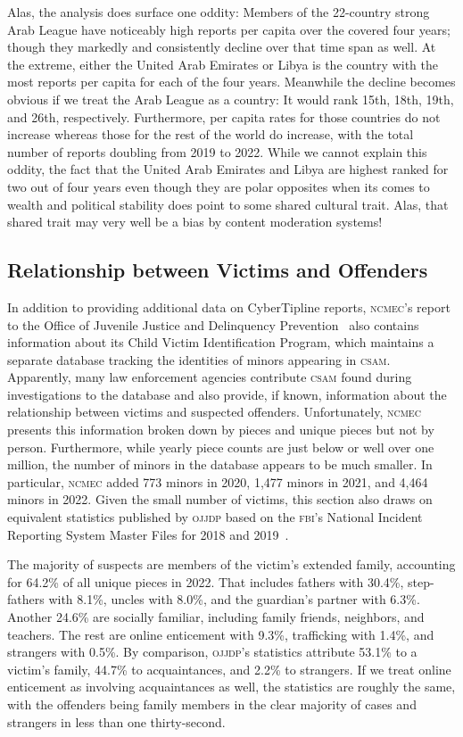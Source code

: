\documentclass[nonacm,screen]{acmart}
\newcommand\V[1]{\textsc{\MakeLowercase{#1}}}
\begin{document}
\begin{itemize}
{Alas, the analysis does surface one oddity: Members of the 22-country strong
Arab League have noticeably high reports per capita over the covered four years;
though they markedly and consistently decline over that time span as well. At
the extreme, either the United Arab Emirates or Libya is the country with the
most reports per capita for each of the four years. Meanwhile the decline
becomes obvious if we treat the Arab League as a country: It would rank 15th,
18th, 19th, and 26th, respectively. Furthermore, per capita rates for those
countries do not increase whereas those for the rest of the world do increase,
with the total number of reports doubling from 2019 to 2022. While we cannot
explain this oddity, the fact that the United Arab Emirates and Libya are
highest ranked for two out of four years even though they are polar opposites
when its comes to wealth and political stability does point to some shared
cultural trait. Alas, that shared trait may very well be a bias by content
moderation systems!


\subsection{Relationship between Victims and Offenders}

In addition to providing additional data on CyberTipline reports, \V{NCMEC}'s
report to the Office of Juvenile Justice and Delinquency
Prevention~\cite{NCMEC2023} also contains information about its Child Victim
Identification Program, which maintains a separate database tracking the
identities of minors appearing in \V{CSAM}. Apparently, many law enforcement
agencies contribute \V{CSAM} found during investigations to the database and
also provide, if known, information about the relationship between victims and
suspected offenders. Unfortunately, \V{NCMEC} presents this information broken
down by pieces and unique pieces but not by person. Furthermore, while yearly
piece counts are just below or well over one million, the number of minors in
the database appears to be much smaller. In particular, \V{NCMEC} added 773
minors in 2020, 1,477 minors in 2021, and 4,464 minors in 2022. Given the small
number of victims, this section also draws on equivalent statistics published by
\V{OJJDP} based on the \V{FBI}'s National Incident Reporting System Master Files
for 2018 and 2019~\cite{OJJDPStats2022}.

The majority of suspects are members of the victim's extended family, accounting
for 64.2\% of all unique pieces in 2022. That includes fathers with 30.4\%,
step-fathers with 8.1\%, uncles with 8.0\%, and the guardian's partner with
6.3\%. Another 24.6\% are socially familiar, including family friends,
neighbors, and teachers. The rest are online enticement with 9.3\%, trafficking
with 1.4\%, and strangers with 0.5\%. By comparison, \V{OJJDP}'s statistics
attribute 53.1\% to a victim's family, 44.7\% to acquaintances, and 2.2\% to
strangers. If we treat online enticement as involving acquaintances as well, the
statistics are roughly the same, with the offenders being family members in the
clear majority of cases and strangers in less than one thirty-second.

}
\end{itemize}
\end{document}
